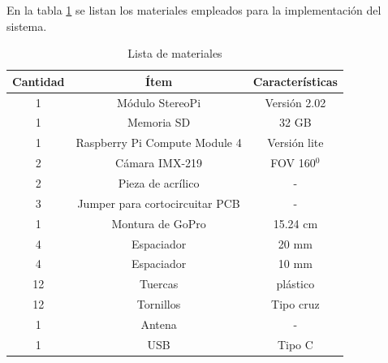 En la tabla \ref{BOM} se listan los materiales empleados para la implementación del sistema.
\begin{table}[H]
\centering
\caption{Lista de materiales}
\label{BOM}
\begin{tabular}{|c|c|c|}
\hline
Cantidad & Ítem                           & Características             \\ \hline
1        & Módulo StereoPi                & Versión 2.02                \\ \hline
1        & Memoria SD                     & 32 GB                       \\ \hline
1        & Raspberry Pi Compute Module 4  & Versión lite                \\ \hline
2        & Cámara IMX-219                 & FOV 160$^0$                \\ \hline
2        & Pieza de acrílico              & -                           \\ \hline
3        & Jumper para cortocircuitar PCB & -                           \\ \hline
1        & Montura de GoPro               & 15.24 cm                    \\ \hline
4        & Espaciador                     & 20 mm                       \\ \hline
4        & Espaciador                     & 10 mm                       \\ \hline
12       & Tuercas                        & plástico                    \\ \hline
12       & Tornillos                      & Tipo cruz                   \\ \hline
1        & Antena                         & -                           \\ \hline
1        & USB                            & Tipo C                      \\ \hline
\end{tabular}
\end{table}